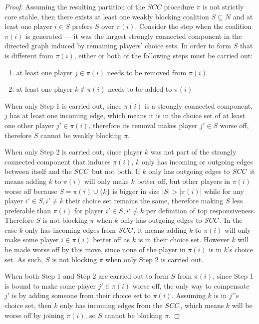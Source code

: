 \begin{proof}
Assuming the resulting partition of the $SCC$ procedure $\pi$ is not strictly core
stable, then there exists at least one weakly blocking coalition $S \subseteq N$
and at least one player $i \in S$ prefers $S$ over $\pi(i)$.
Consider the step when the coalition $\pi(i)$ is generated --- it was the largest
strongly connected component in the directed graph induced by remaining players'
choice sets.
In order to form $S$ that is different from $\pi(i)$, either or both of the
following steps must be carried out:

\begin{enumerate}
  \item at least one player $j \in \pi(i)$ needs to be removed from $\pi(i)$
  \item at least one player $k \notin \pi(i)$ needs to be added to $\pi(i)$
\end{enumerate}

When only Step 1 is carried out, since $\pi(i)$ is a strongly connected component,
$j$ has at least one incoming edge, which means it is in the choice set of at
least one other player $j' \in \pi(i)$, therefore its removal makes player
$j' \in S$ worse off, therefore $S$ cannot be weakly blocking $\pi$.

When only Step 2 is carried out, since player $k$ was not part of the strongly
connected component that induces $\pi(i)$, $k$ only has incoming or outgoing edges
between itself and the $\mathit{SCC}$ but not both.
If $k$ only has outgoing edges to $\mathit{SCC}$ it means adding $k$ to $\pi(i)$ will only
make $k$ better off, but other players in $\pi(i)$ worse off because
$S = \pi(i) \cup \{k\}$ is bigger in size $|S| > |\pi(i)|$ while for any player
$i' \in S, i' \neq k$ their choice set remains the same, therefore making $S$ less
preferable than $\pi(i)$ for player $i' \in S, i' \neq k$ per definition of top
responsiveness.
Therefore $S$ is not blocking $\pi$ when $k$ only has outgoing edges to $\mathit{SCC}$.
In the case $k$ only has incoming edges from $\mathit{SCC}$, it means adding $k$ to
$\pi(i)$ will only make some player $i \in \pi(i)$ better off as $k$ is in their
choice set.
However $k$ will be made worse off by this move, since none of the player in
$\pi(i)$ is in $k$'s choice set.
As such, $S$ is not blocking $\pi$ when only Step 2 is carried out.

When both Step 1 and Step 2 are carried out to form $S$ from $\pi(i)$, since
Step 1 is bound to make some player $j' \in \pi(i)$ worse off, the only way to
compensate $j'$ is by adding someone from their choice set to $\pi(i)$.
Assuming $k$ is in $j'$'s choice set, then $k$ only has incoming edges from the
$\mathit{SCC}$, which means $k$ will be worse off by joining $\pi(i)$, so $S$ cannot be
blocking $\pi$.
\end{proof}

